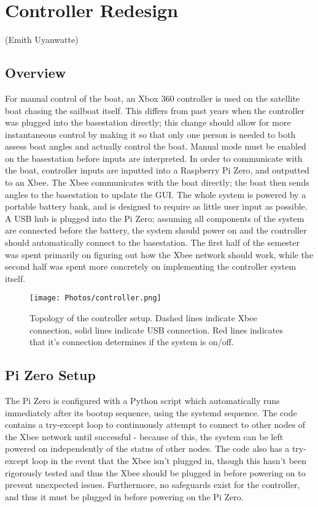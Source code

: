 \documentclass{article}
\begin{document}
\newline

\section{Controller Redesign}
(Emith Uyanwatte)
\subsection{Overview}

For manual control of the boat, an Xbox 360 controller is used on the satellite boat chasing the sailboat itself. This differs from past years when the controller was plugged into the basestation directly; this change should allow for more instantaneous control by making it so that only one person is needed to both assess boat angles and actually control the boat. Manual mode must be enabled on the basestation before inputs are interpreted. In order to communicate with the boat, controller inputs are inputted into a Raspberry Pi Zero, and outputted to an Xbee. The Xbee communicates with the boat directly; the boat then sends angles to the basestation to update the GUI. The whole system is powered by a portable battery bank, and is designed to require as little user input as possible. A USB hub is plugged into the Pi Zero; assuming all components of the system are connected before the battery, the system should power on and the controller should automatically connect to the basestation. The first half of the semester was spent primarily on figuring out how the Xbee network should work, while the second half was spent more concretely on implementing the controller system itself. 

\begin{figure}[htp]
    \centering
    \texttt{[image: Photos/controller.png]}
    \caption{Topology of the controller setup. Dashed lines indicate Xbee connection, solid lines indicate USB connection. Red lines indicates that it's connection determines if the system is on/off.}
    \label{Photos/fig:controller.png}
\end{figure}

\subsection{Pi Zero Setup}
The Pi Zero is configured with a Python script which automatically runs immediately after its bootup sequence, using the systemd sequence. The code contains a try-except loop to continuously attempt to connect to other nodes of the Xbee network until successful - because of this, the system can be left powered on independently of the status of other nodes. The code also has a try-except loop in the event that the Xbee isn’t plugged in, though this hasn’t been rigorously tested and thus the Xbee should be plugged in before powering on to prevent unexpected issues. Furthermore, no safeguards exist for the controller, and thus it must be plugged in before powering on the Pi Zero.
\end{document}
